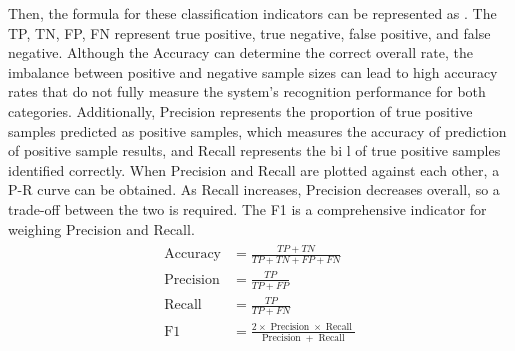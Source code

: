Then, the formula for these classification indicators can be represented as \eqname{\ref{fml:ch3-conmat}}. The TP, TN, FP, FN represent true positive, true negative, false positive, and false negative. Although the Accuracy can determine the correct overall rate, the imbalance between positive and negative sample sizes can lead to high accuracy rates that do not fully measure the system's recognition performance for both categories. Additionally, Precision represents the proportion of true positive samples predicted as positive samples, which measures the accuracy of prediction of positive sample results, and Recall represents the bi l of true positive samples identified correctly. When Precision and Recall are plotted against each other, a P-R curve can be obtained. As Recall increases, Precision decreases overall, so a trade-off between the two is required. The F1 is a comprehensive indicator for weighing Precision and Recall.
\begin{align}\label{fml:ch3-conmat}
    \begin{split}
        \operatorname{Accuracy} &= \frac{TP+TN}{TP+TN+FP+FN} \\
        \operatorname{Precision} &= \frac{TP}{TP+FP} \\
        \operatorname{Recall} &= \frac{TP}{TP+FN} \\
        \operatorname{F1} &= \frac{2\times \operatorname{Precision}\times\operatorname{Recall}}{\operatorname{Precision}+\operatorname{Recall}}
    \end{split}
\end{align}
